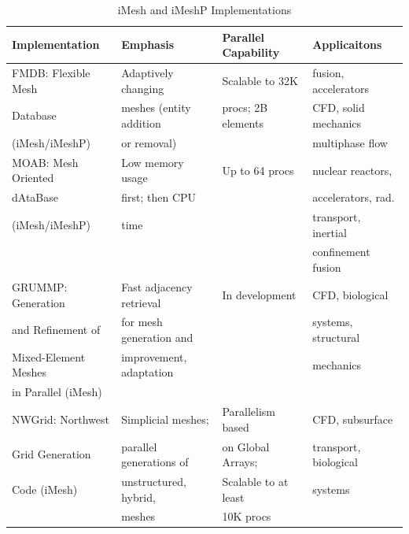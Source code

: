 \documentclass[letterpaper]{jpconf}
\begin{document}
\begin{table}[thbp]
\begin{center}
\caption{iMesh and iMeshP Implementations}
\label{tab:implementations}
\begin{small}

\begin{tabular}{|l|l|l|l|}
\hline
{\bf Implementation} & {\bf Emphasis}  & {\bf Parallel Capability} & {\bf Applicaitons} \\
\hline
FMDB: Flexible Mesh           & Adaptively changing      & Scalable to 32K & fusion, accelerators \\
Database \cite{ReSh03,Seol06} & meshes (entity addition  & procs; 2B elements & CFD, solid mechanics \\
(iMesh/iMeshP)         & or removal)                     &             & multiphase flow \\
\hline
MOAB: Mesh Oriented & Low memory usage & Up to 64 procs &  nuclear reactors, \\
dAtaBase \cite{moab}& first; then CPU  &                & accelerators, rad. \\
(iMesh/iMeshP)                    & time             &                & transport, inertial \\
 & & & confinement fusion\\
\hline
GRUMMP: Generation   & Fast adjacency retrieval & In development & CFD, biological \\
and Refinement of    & for mesh generation and  &  & systems, structural \\
Mixed-Element Meshes  & improvement, adaptation  &  & mechanics \\
in Parallel \cite{GRUMMP:http} (iMesh) & & & \\
\hline
NWGrid: Northwest & Simplicial meshes; &      Parallelism based &  CFD, subsurface \\
Grid Generation   & parallel generations of & on Global Arrays; & transport, biological \\
Code \cite{nwgrid3} (iMesh) & unstructured, hybrid, &   Scalable to at least & systems \\
                    & meshes &                  10K procs &  \\
\hline
\end{tabular}
\end{small}
\end{center}
\end{table}
\end{document}
